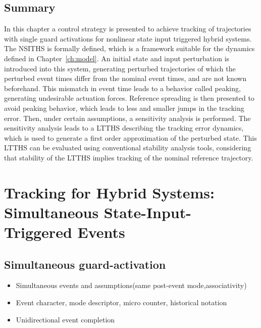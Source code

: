 \documentclass[../DC2017114Bouma.tex]{subfiles}
\begin{document}
\section{Summary}
In this chapter a control strategy is presented to achieve tracking of trajectories with single guard activations for nonlinear state input triggered hybrid systems. The NSITHS is formally defined, which is a framework suitable for the dynamics defined in Chapter~\ref{ch:model}. An initial state and input perturbation is introduced into this system, generating perturbed trajectories of which the perturbed event times differ from the nominal event times, and are not known beforehand. This mismatch in event time leads to a behavior called peaking, generating undesirable actuation forces. Reference spreading is then presented to avoid peaking behavior, which leads to less and smaller jumps in the tracking error. Then, under certain assumptions, a sensitivity analysis is performed. The sensitivity analysis leads to a LTTHS describing the tracking error dynamics, which is used to generate a first order approximation of the perturbed state. This LTTHS can be evaluated using conventional stability analysis tools, considering that stability of the LTTHS implies tracking of the nominal reference trajectory.
\cleartooddpage
\chapter{Tracking for Hybrid Systems: Simultaneous State-Input-Triggered Events}\label{ch:simult}
\cite{Rijnen2018}
\section{Simultaneous guard-activation}
\begin{itemize}
\item Simultaneous events and assumptions(same post-event mode,associativity)
\item Event character, mode descriptor, micro counter, historical notation
\item Unidirectional event completion
\end{itemize}
%
%
%
%
%
%
%
%
%
\end{document}

